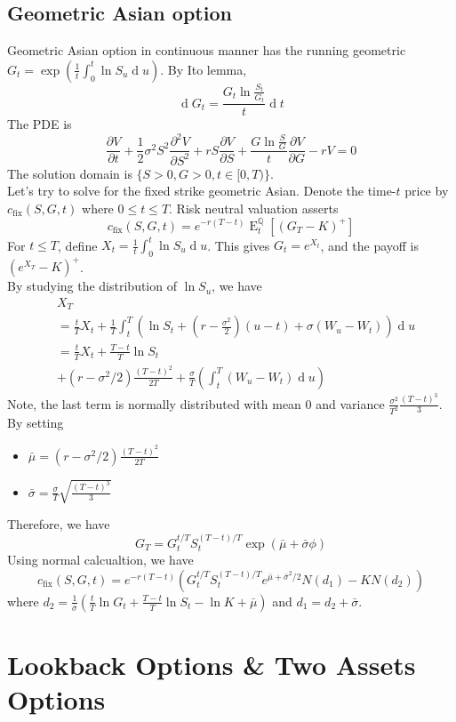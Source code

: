 \documentclass[12pt]{article}
\theoremstyle{definition}
\DeclareMathOperator{\diff}{d}
\DeclareMathOperator{\expec}{E}
\begin{document}
\subsection{Geometric Asian option}
Geometric Asian option in continuous manner has the running geometric $G_t=\exp(\frac{1}{t}\int_0^t \ln S_u\diff u)$. By Ito lemma,
\[
\diff G_t=\frac{G_t\ln \frac{S_t}{G_t}}{t}\diff t
\]
The PDE is 
\[
\frac{\partial V}{\partial t}+\frac{1}{2}\sigma^2 S^2\frac{\partial^2 V}{\partial S^2}+rS\frac{\partial V}{\partial S}+\frac{G\ln \frac{S}{G}}{t}\frac{\partial V}{\partial G}-rV=0
\]
The solution domain is $\{S>0, G>0, t\in [0,T)\}$.\\
Let's try to solve for the fixed strike geometric Asian. Denote the time-$t$ price by $c_\text{fix}(S,G,t)$ where $0\leq t\leq T$. Risk neutral valuation asserts
\[
c_\text{fix}(S,G,t)=e^{-r(T-t)}\expec_t^{\mathbb{Q}}[(G_T-K)^{+}]
\]
For $t\leq T$, define $X_t=\frac{1}{t}\int_0^t\ln S_u\diff u$. This gives $G_t=e^{X_t}$, and the payoff is $(e^{X_T}-K)^{+}$.\\
By studying the distribution of $\ln S_u$, we have
\begin{align*}
&X_T\\
&=\frac{t}{T}X_t+\frac{1}{T}\int_t^T(\ln S_t+(r-\frac{\sigma^2}{2})(u-t)+\sigma(W_u-W_t))\diff u\\
&=\frac{t}{T}X_t+\frac{T-t}{T}\ln S_t\\
&+(r-\sigma^2/2)\frac{(T-t)^2}{2T}+\frac{\sigma}{T}(\int_t^T (W_u-W_t)\diff u)
\end{align*}
Note, the last term is normally distributed with mean $0$ and variance $\frac{\sigma^2}{T^2}\frac{(T-t)^3}{3}$.\\
By setting
\begin{itemize}
  \item $\bar{\mu}=(r-\sigma^2/2)\frac{(T-t)^2}{2T}$
  \item $\bar{\sigma}=\frac{\sigma}{T}\sqrt{\frac{(T-t)^3}{3}}$
\end{itemize}
Therefore, we have
\[
G_T=G_t^{t/T}S_t^{(T-t)/T}\exp(\bar{\mu}+\bar{\sigma}\phi)
\]
Using normal calcualtion, we have
\[
c_\text{fix}(S,G,t)=e^{-r(T-t)}(G_t^{t/T}S_t^{(T-t)/T}e^{\bar{\mu}+\bar{\sigma}^2/2}N(d_1)-KN(d_2))
\]
where $d_2=\frac{1}{\bar{\sigma}}(\frac{t}{T}\ln G_t+\frac{T-t}{T}\ln S_t-\ln K+\bar{\mu})$ and $d_1=d_2+\bar{\sigma}$.

\section{Lookback Options \& Two Assets Options}
\end{document}
